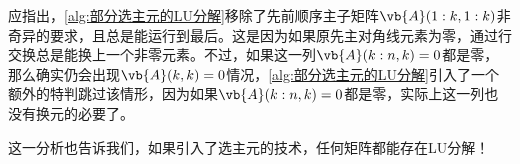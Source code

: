 应指出，\cref{alg:部分选主元的LU分解}移除了先前顺序主子矩阵$\vb{A}(1:k,1:k)$非奇异的要求，且总是能运行到最后。这是因为如果原先主对角线元素为零，通过行交换总是能换上一个非零元素。不过，如果这一列$\vb{A}(k:n,k)=0$都是零，那么确实仍会出现$\vb{A}(k,k)=0$情况，\cref{alg:部分选主元的LU分解}引入了一个额外的特判跳过该情形，因为如果$\vb{A}(k:n,k)=0$都是零，实际上这一列也没有换元的必要了。

这一分析也告诉我们，如果引入了选主元的技术，任何矩阵都能存在LU分解！
